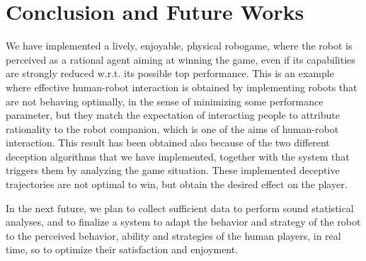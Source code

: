 \section{Conclusion and Future Works}
\label{S:Conclusion}
We have implemented a lively, enjoyable, physical robogame, where the robot is perceived as a rational agent aiming at winning the game, even if its capabilities are strongly reduced w.r.t. its possible top performance. This is an example where effective human-robot interaction is obtained by implementing robots that are not behaving optimally, in the sense of minimizing some performance parameter, but they match the expectation of interacting people to attribute rationality to the robot companion, which is one of the aims of human-robot interaction.
This result has been obtained also because of the two different deception algorithms that we have implemented, together with the system that triggers them by analyzing the game situation. These implemented deceptive trajectories are not optimal to win, but obtain the desired effect on the player. 

In the next future, we plan to collect sufficient data to perform sound statistical analyses, and to finalize a system to adapt the behavior and strategy of the robot to the perceived behavior, ability and strategies of the human players, in real time, so to optimize their satisfaction and enjoyment. 
